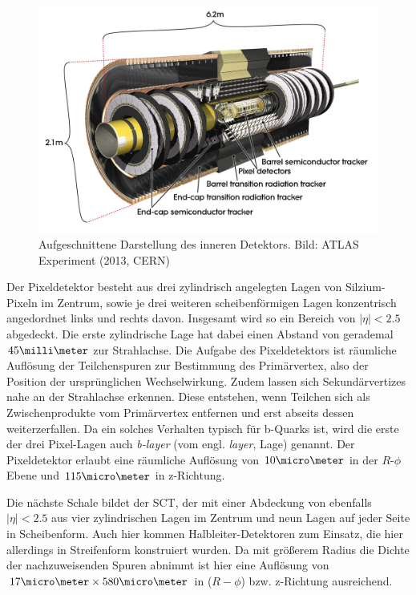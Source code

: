 \begin{figure}
    \centering
    \includegraphics[width=.8\textwidth]{img/inner_detector}
    \caption[Darstellung des inneren Detektors]
        {Aufgeschnittene Darstellung des inneren Detektors. Bild: ATLAS
        Experiment (2013, CERN)}
    \label{fig:inner_detector}
\end{figure}

Der Pixeldetektor besteht aus drei zylindrisch angelegten Lagen von
Silzium-Pixeln im Zentrum, sowie je drei weiteren scheibenförmigen Lagen
konzentrisch angedordnet links und rechts davon. Insgesamt wird so ein Bereich
von $|\eta| < 2.5$ abgedeckt. Die erste zylindrische Lage hat dabei einen
Abstand von gerademal $45\milli\meter$ zur Strahlachse. Die Aufgabe des
Pixeldetektors ist räumliche Auflösung der Teilchenspuren zur Bestimmung des
Primärvertex, also der Position der ursprünglichen Wechselwirkung. Zudem lassen
sich Sekundärvertizes nahe an der Strahlachse erkennen. Diese entstehen, wenn
Teilchen sich als Zwischenprodukte vom Primärvertex entfernen und erst abseits
dessen weiterzerfallen. Da ein solches Verhalten typisch für b-Quarks ist, wird
die erste der drei Pixel-Lagen auch \textit{b-layer} (vom engl. \textit{layer},
Lage) genannt. Der Pixeldetektor erlaubt eine räumliche Auflösung von
$10\micro\meter$ in der $R$-$\phi$ Ebene und $115\micro\meter$ in z-Richtung.

Die nächste Schale bildet der \acf{SCT}, der mit einer Abdeckung von ebenfalls
$|\eta| < 2.5$ aus vier zylindrischen Lagen im Zentrum und neun Lagen auf jeder
Seite in Scheibenform. Auch hier kommen Halbleiter-Detektoren zum Einsatz, die
hier allerdings in Streifenform konstruiert wurden. Da mit größerem Radius die
Dichte der nachzuweisenden Spuren abnimmt ist hier eine Auflösung von
$17\micro\meter \times 580\micro\meter$ in ($R-\phi$) bzw. z-Richtung
ausreichend.

